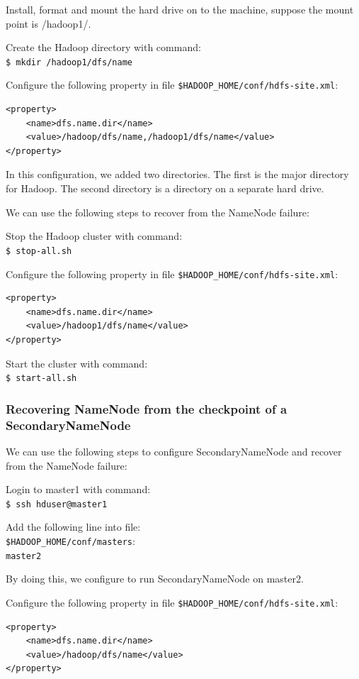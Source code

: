 Install, format and mount the hard drive on to the machine, suppose the mount point is /hadoop1/.

Create the Hadoop directory with command: \\
\verb|$ mkdir /hadoop1/dfs/name|

Configure the following property in file \verb|$HADOOP_HOME/conf/hdfs-site.xml|:
\lstset{style=bashstyle}
\begin{lstlisting}
<property>
    <name>dfs.name.dir</name>
    <value>/hadoop/dfs/name,/hadoop1/dfs/name</value>
</property>
\end{lstlisting}

In this configuration, we added two directories. The first is the major directory for Hadoop. The second directory is a directory on a separate hard drive.

We can use the following steps to recover from the NameNode failure:

Stop the Hadoop cluster with command: \\
\verb|$ stop-all.sh|

Configure the following property in file \verb|$HADOOP_HOME/conf/hdfs-site.xml|:
\lstset{style=bashstyle}
\begin{lstlisting}
<property>
    <name>dfs.name.dir</name>
    <value>/hadoop1/dfs/name</value>
</property>
\end{lstlisting}

Start the cluster with command: \\
\verb|$ start-all.sh|

\subsubsection*{Recovering NameNode from the checkpoint of a SecondaryNameNode}
We can use the following steps to configure SecondaryNameNode and recover from the NameNode failure:

Login to master1 with command:\\
\verb|$ ssh hduser@master1|

Add the following line into file:\\
 \verb|$HADOOP_HOME/conf/masters|:\\
\verb|master2|

By doing this, we configure to run SecondaryNameNode on master2.

Configure the following property in file \verb|$HADOOP_HOME/conf/hdfs-site.xml|:
\lstset{style=bashstyle}
\begin{lstlisting}
<property>
    <name>dfs.name.dir</name>
    <value>/hadoop/dfs/name</value>
</property>
\end{lstlisting}

